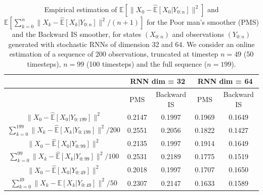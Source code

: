 \documentclass{article}
\begin{document}
\begin{table}
\caption{Empirical estimation of $\mathbb{E}[\|X_0 - \mathbb{\widehat{E}}[X_0|Y_{0:n}]\|^2]$ and $\mathbb{E}[ \sum_{k=0}^{n}\|X_k - \mathbb{\widehat{E}}[X_k|Y_{0:n}]\|^2/(n+1)]$ for the Poor man's smoother (PMS) and the Backward IS smoother, for states $(X_{0:n})$ and observations $(Y_{0:n})$ generated with stochastic RNNs of dimension 32 and 64. We consider an online estimation of a sequence of 200 observations, truncated at timestep $n=49$ (50 timesteps), $n=99$ (100 timesteps) and the full sequence ($n=199$).}
\label{table:RNN_exp}
\centering 
\begin{tabular}{c|cc|cc}
 & \multicolumn{2}{c}{RNN dim = 32} & \multicolumn{2}{c}{RNN dim = 64} \\\toprule
\hline
 &  PMS & Backward IS &  PMS & Backward IS \\
\hline
$\|X_0 - \mathbb{\widehat{E}}[X_0|Y_{0:199}]\|^2$ & 0.2147 & 0.1997 & 0.1969 & 0.1649\\
$ \sum_{k=0}^{199} \|X_k - \mathbb{\widehat{E}}[X_k|Y_{0:199}]\|^2/200$ & 0.2551 & 0.2056  & 0.1822 & 0.1427 \\
\hline
$\|X_0 - \mathbb{\widehat{E}}[X_0|Y_{0:99}]\|^2$ & 0.2135 & 0.1997 & 0.1914 & 0.1649 \\
$ \sum_{k=0}^{99} \|X_k - \mathbb{\widehat{E}}[X_k|Y_{0:99}]\|^2/100$ & 0.2531 & 0.2189 & 0.1775 & 0.1519\\
\hline
$\|X_0 - \mathbb{\widehat{E}}[X_0|Y_{0:49}]\|^2$ & 0.2018 & 0.1997 & 0.1707 & 0.1650\\
$\sum_{k=0}^{49} \|X_k - \mathbb{\widehat{E}}[X_k|Y_{0:49}]\|^2/50$ & 0.2307 & 0.2147 & 0.1633 & 0.1589\\
\hline
\bottomrule
\end{tabular}
\end{table}
\end{document}
